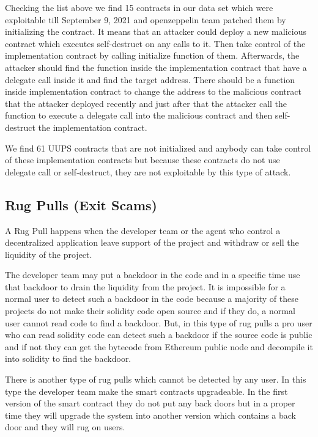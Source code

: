 Checking the list above we find 15 contracts in our data set which were exploitable till September 9, 2021 and openzeppelin team patched them by initializing the contract. It means that an attacker could deploy a new malicious contract which executes self-destruct on any calls to it. Then take control of the implementation contract by calling initialize function of them. Afterwards, the attacker should find the function inside the implementation contract that have a delegate call inside it and find the target address. There should be a function inside implementation contract to change the address to the malicious contract that the attacker deployed recently and just after that the attacker call the function to execute a delegate call into the malicious contract and then self-destruct the implementation contract.

We find 61 UUPS contracts that are not initialized and anybody can take control of these implementation contracts but because these contracts do not use delegate call or self-destruct, they are not exploitable by this type of attack.

\subsection{Rug Pulls (Exit Scams)}





A Rug Pull happens when the developer team or the agent who control a decentralized application leave support of the project and withdraw or sell the liquidity of the project\cite{rugPool}.

The developer team may put a backdoor in the code and in a specific time use that backdoor to drain the liquidity from the project. It is impossible for a normal user to detect such a backdoor in the code because a majority of these projects do not make their solidity code open source and if they do, a normal user cannot read code to find a backdoor. But, in this type of rug pulls a pro user who can read solidity code can detect such a backdoor if the source code is public and if not they can get the bytecode from Ethereum public node and decompile it into solidity to find the backdoor.

There is another type of rug pulls which cannot be detected by any user. In this type the developer team make the smart contracts upgradeable. In the first version of the smart contract they do not put any back doors but in a proper time they will upgrade the system into another version which contains a back door and they will rug on users. 


